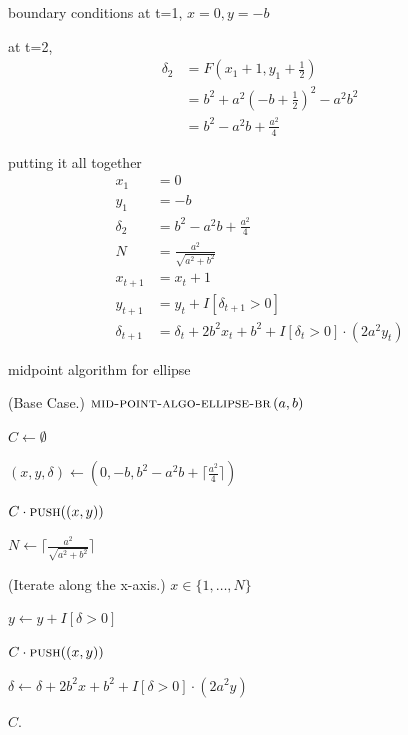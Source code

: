 \documentclass[aspectratio=169,xcolor={dvipsnames,svgnames}]{beamer}
\begin{document}
\begin{frame}[label={sec:org0f8dc4d}]{boundary conditions}
at t=1, \(x=0, y=-b\)

at t=2,
\begin{align*}
  \delta_{2}
  &=F(x_{1}+1,y_{1}+\frac12) \\
  &=b^2 + a^2(-b+\frac12)^2-a^2b^2 \\
  &=b^2-a^2b+\frac{a^2}{4}
\end{align*}
\end{frame}


\begin{frame}[label={sec:orgd3fcb15}]{putting it all together}
\begin{align*}
  x_1&=0 \\
  y_1&=-b \\
  \delta_{2}&=b^2-a^2b+\frac{a^2}{4} \\
  N &= \frac{a^2}{\sqrt{a^2+b^2}} \\
  x_{t+1} &= x_t+1 \\
  y_{t+1} &= y_t+I[\delta_{t+1}>0] \\
  \delta_{t+1} &= \delta_t + 2b^2x_t+b^2 +
                 I[\delta_t>0]\cdot(2a^2y_t)
\end{align*}
\end{frame}

\begin{frame}[label={sec:org5d4716c}]{midpoint algorithm for ellipse}
\begin{algorithm}[H]
  \caption{Mid Point Algorithm for Ellispe (BottomRight)}
  \DontPrintSemicolon

  \Fn(\hfill {\scriptsize Base Case.}){\upshape
    $\textsc{mid-point-algo-ellipse-br}\, (a,b)$}{


    $C\gets\emptyset$

    $(x,y,\delta)\gets(0,-b,b^2-a^2b +
    \lceil\frac{a^2}{4}\rceil)$

    $C\cdot\textsc{push}((x,y))$

    $N\gets \lceil\frac{a^2}{\sqrt{a^2+b^2}}\rceil$

    \For(\hfill{\scriptsize Iterate along the x-axis.})
    {$x\in\{1,\ldots,N\}$} {

      $y\gets y+I[\delta>0]$
      
      $C\cdot\textsc{push}((x,y))$

      $\delta\gets \delta + 2b^2x+b^2 +
      I[\delta>0]\cdot(2a^2y)$

    }

    \Return $C$.

  }    
\end{algorithm}
\end{frame}
\end{document}
